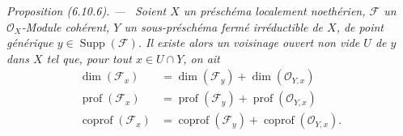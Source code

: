 \documentclass[10pt,oneside]{book}
\newenvironment{proposition}[1][]{%
  \par\medskip\noindent\itshape Proposition (#1). ---\ }{\par}
\begin{document}
\begin{proposition}[6.10.6]
\label{IV.2.s6.10.6-fr}
Soient $X$ un préschéma localement noethérien, $\mathcal F$ un
$\mathcal O_X$-Module cohérent, $Y$ un sous-préschéma fermé irréductible de
$X$, de point générique $y\in\operatorname{Supp}(\mathcal F)$. Il existe
alors un voisinage ouvert non vide $U$ de $y$ dans $X$ tel que, pour tout
$x\in U\cap Y$, on ait
\begin{align}
\dim(\mathcal F_x)&=\dim(\mathcal F_y)+\dim(\mathcal O_{Y,x})
\tag{6.10.6.1}\label{IV.2.s6.10.6.1-fr}\\
\operatorname{prof}(\mathcal F_x)&=\operatorname{prof}(\mathcal F_y)+
\operatorname{prof}(\mathcal O_{Y,x})
\tag{6.10.6.2}\label{IV.2.s6.10.6.2-fr}\\
\operatorname{coprof}(\mathcal F_x)&=\operatorname{coprof}(\mathcal F_y)+
\operatorname{coprof}(\mathcal O_{Y,x}).
\tag{6.10.6.3}\label{IV.2.s6.10.6.3-fr}
\end{align}
\end{proposition}
\end{document}
